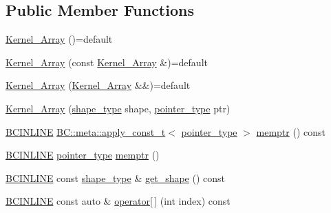 \subsection*{Public Member Functions}
\begin{DoxyCompactItemize}
\item 
\hyperlink{structBC_1_1tensors_1_1exprs_1_1Kernel__Array_a262141e16cc68d58348df2c9ea57765a}{Kernel\+\_\+\+Array} ()=default
\item 
\hyperlink{structBC_1_1tensors_1_1exprs_1_1Kernel__Array_ac5b7cd93bfee666848a1aedc0e44abab}{Kernel\+\_\+\+Array} (const \hyperlink{structBC_1_1tensors_1_1exprs_1_1Kernel__Array}{Kernel\+\_\+\+Array} \&)=default
\item 
\hyperlink{structBC_1_1tensors_1_1exprs_1_1Kernel__Array_afeed66bebc6f407309d60dbd33e5596b}{Kernel\+\_\+\+Array} (\hyperlink{structBC_1_1tensors_1_1exprs_1_1Kernel__Array}{Kernel\+\_\+\+Array} \&\&)=default
\item 
\hyperlink{structBC_1_1tensors_1_1exprs_1_1Kernel__Array_aa109cf0c04aa87ce3cc1ace72ec2407c}{Kernel\+\_\+\+Array} (\hyperlink{structBC_1_1tensors_1_1exprs_1_1Kernel__Array_a9f2f703576ae567dcaf5e199bc3ef0f6}{shape\+\_\+type} shape, \hyperlink{structBC_1_1tensors_1_1exprs_1_1Kernel__Array_a63f8901ef5aa43d1aaa33698e5b2bcce}{pointer\+\_\+type} ptr)
\item 
\hyperlink{BlackCat__Common_8h_a6699e8b0449da5c0fafb878e59c1d4b1}{B\+C\+I\+N\+L\+I\+NE} \hyperlink{namespaceBC_1_1meta_a210dff319dbb0dd2a60fcfdda5779ace}{B\+C\+::meta\+::apply\+\_\+const\+\_\+t}$<$ \hyperlink{structBC_1_1tensors_1_1exprs_1_1Kernel__Array_a63f8901ef5aa43d1aaa33698e5b2bcce}{pointer\+\_\+type} $>$ \hyperlink{structBC_1_1tensors_1_1exprs_1_1Kernel__Array_a7f63698eb9c4e13fe6a7b8eda4b42261}{memptr} () const 
\item 
\hyperlink{BlackCat__Common_8h_a6699e8b0449da5c0fafb878e59c1d4b1}{B\+C\+I\+N\+L\+I\+NE} \hyperlink{structBC_1_1tensors_1_1exprs_1_1Kernel__Array_a63f8901ef5aa43d1aaa33698e5b2bcce}{pointer\+\_\+type} \hyperlink{structBC_1_1tensors_1_1exprs_1_1Kernel__Array_ac0fa35cb7669705932013f931ff94157}{memptr} ()
\item 
\hyperlink{BlackCat__Common_8h_a6699e8b0449da5c0fafb878e59c1d4b1}{B\+C\+I\+N\+L\+I\+NE} const \hyperlink{structBC_1_1tensors_1_1exprs_1_1Kernel__Array_a9f2f703576ae567dcaf5e199bc3ef0f6}{shape\+\_\+type} \& \hyperlink{structBC_1_1tensors_1_1exprs_1_1Kernel__Array_ae108e68df28c1c64c3a2365dff86e8a1}{get\+\_\+shape} () const 
\item 
\hyperlink{BlackCat__Common_8h_a6699e8b0449da5c0fafb878e59c1d4b1}{B\+C\+I\+N\+L\+I\+NE} const auto \& \hyperlink{structBC_1_1tensors_1_1exprs_1_1Kernel__Array_a09d271a12cf0b6cf4dd5a81fa1814210}{operator\mbox{[}$\,$\mbox{]}} (int index) const 

\end{DoxyCompactItemize}
